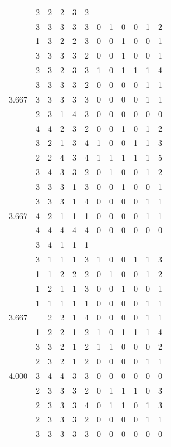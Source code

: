 \documentclass[]{book}
\theoremstyle{definition}
\theoremstyle{definition}
\theoremstyle{definition}
\theoremstyle{remark}
\begin{document}
\begin{table}
{\begin{tabular}[t]{rrrrrrrrrrrr}
 & 2 & 2 & 2 & 3 & 2 &  &  &  &  &  & \\
 & 3 & 3 & 3 & 3 & 3 & 0 & 1 & 0 & 0 & 1 & 2\\
 & 1 & 3 & 2 & 2 & 3 & 0 & 0 & 1 & 0 & 0 & 1\\
 & 3 & 3 & 3 & 3 & 2 & 0 & 0 & 1 & 0 & 0 & 1\\
 & 2 & 3 & 2 & 3 & 3 & 1 & 0 & 1 & 1 & 1 & 4\\
 & 3 & 3 & 3 & 3 & 2 & 0 & 0 & 0 & 0 & 1 & 1\\
3.667 & 3 & 3 & 3 & 3 & 3 & 0 & 0 & 0 & 0 & 1 & 1\\
 & 2 & 3 & 1 & 4 & 3 & 0 & 0 & 0 & 0 & 0 & 0\\
 & 4 & 4 & 2 & 3 & 2 & 0 & 0 & 1 & 0 & 1 & 2\\
 & 3 & 2 & 1 & 3 & 4 & 1 & 0 & 0 & 1 & 1 & 3\\
 & 2 & 2 & 4 & 3 & 4 & 1 & 1 & 1 & 1 & 1 & 5\\
 & 3 & 4 & 3 & 3 & 2 & 0 & 1 & 0 & 0 & 1 & 2\\
 & 3 & 3 & 3 & 1 & 3 & 0 & 0 & 1 & 0 & 0 & 1\\
 & 3 & 3 & 3 & 1 & 4 & 0 & 0 & 0 & 0 & 1 & 1\\
3.667 & 4 & 2 & 1 & 1 & 1 & 0 & 0 & 0 & 0 & 1 & 1\\
 & 4 & 4 & 4 & 4 & 4 & 0 & 0 & 0 & 0 & 0 & 0\\
 & 3 & 4 & 1 & 1 & 1 &  &  &  &  &  & \\
 & 3 & 1 & 1 & 1 & 3 & 1 & 0 & 0 & 1 & 1 & 3\\
 & 1 & 1 & 2 & 2 & 2 & 0 & 1 & 0 & 0 & 1 & 2\\
 & 1 & 2 & 1 & 1 & 3 & 0 & 0 & 1 & 0 & 0 & 1\\
 & 1 & 1 & 1 & 1 & 1 & 0 & 0 & 0 & 0 & 1 & 1\\
3.667 &  & 2 & 2 & 1 & 4 & 0 & 0 & 0 & 0 & 1 & 1\\
 & 1 & 2 & 2 & 1 & 2 & 1 & 0 & 1 & 1 & 1 & 4\\
 & 3 & 3 & 2 & 1 & 2 & 1 & 1 & 0 & 0 & 0 & 2\\
 & 2 & 3 & 2 & 1 & 2 & 0 & 0 & 0 & 0 & 1 & 1\\
4.000 & 3 & 4 & 4 & 3 & 3 & 0 & 0 & 0 & 0 & 0 & 0\\
 & 2 & 3 & 3 & 3 & 2 & 0 & 1 & 1 & 1 & 0 & 3\\
 & 2 & 3 & 3 & 3 & 4 & 0 & 1 & 1 & 0 & 1 & 3\\
 & 2 & 3 & 3 & 3 & 2 & 0 & 0 & 0 & 0 & 1 & 1\\
 & 3 & 3 & 3 & 3 & 3 & 0 & 0 & 0 & 0 & 0 & 0\\

\end{tabular}}
\end{table}
\end{document}
